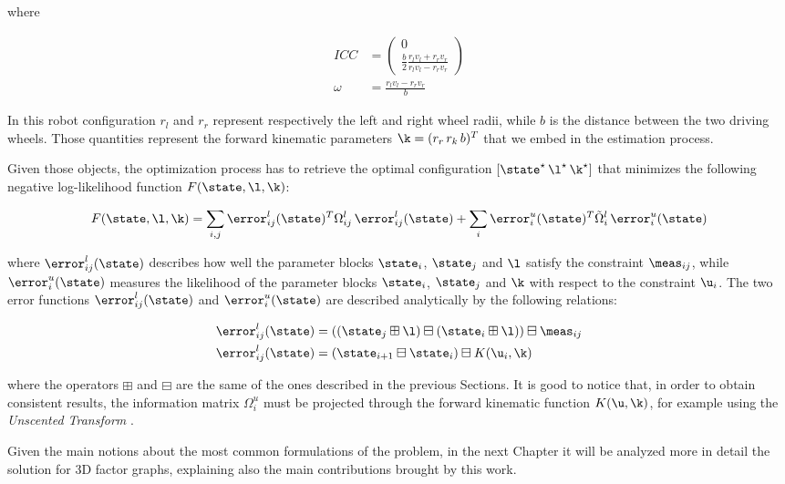 \noindent where 

\begin{align*}
    ICC &= 
        \begin{pmatrix}
            0 \\ \frac{b}{2} \frac{r_l v_l + r_r v_r}{r_l v_l - r_r v_r}
        \end{pmatrix} \\
    \omega &= \frac{r_l v_l - r_r v_r}{b}
\end{align*}

\noindent In this robot configuration $r_l$ and $r_r$ represent respectively the left and right wheel radii, while $b$ is the distance between the two driving wheels. Those quantities represent the forward kinematic parameters $\k = (r_r\,r_k\,b)^T$ that we embed in the estimation process.

Given those objects, the optimization process has to retrieve the optimal configuration $\left[\state^\star \, \l^\star \, \k^\star\right]$ that minimizes the following negative log-likelihood function $F(\state, \l, \k)$:

\begin{equation}
    F(\state, \l, \k) = 
        \sum_{i,j} \error_{ij}^l(\state)^T\Omega_{ij}^l\,\error_{ij}^l(\state) + 
        \sum_{i} \error_{i}^u(\state)^T\tilde{\Omega}_{i}^l\,\error_{i}^u(\state)
\end{equation}

\noindent where $\error_{ij}^l(\state)$ describes how well the parameter blocks $\state_i$, $\state_j$ and $\l$ satisfy the constraint $\meas_{ij}$, while $\error_{i}^u(\state)$ measures the likelihood of the parameter blocks $\state_i$, $\state_j$ and $\k$ with respect to the constraint $\u_i$. The two error functions $\error_{ij}^l(\state)$ and $\error_{i}^u(\state)$ are described analytically by the following relations:

\begin{align*}
    \error_{ij}^l(\state) &= \left(\left(\state_j \boxplus \l\right) \boxminus \left(\state_i \boxplus \l\right)\right) \boxminus \meas_{ij} \\
    \error_{ij}^l(\state) &= \left(\state_{i+1} \boxminus \state_i\right) \boxminus K(\u_i, \k)
\end{align*}

\noindent where the operators $\boxplus$ and $\boxminus$ are the same of the ones described in the previous Sections. It is good to notice that, in order to obtain consistent results, the information matrix $\Omega_{i}^u$ must be projected through the forward kinematic function $K(\u, \k)$, for example using the \textit{Unscented Transform} \cite{julier2002scaledUT}.

\vspace{15px}

Given the main notions about the most common formulations of the problem, in the next Chapter it will be analyzed more in detail the solution for 3D factor graphs, explaining also the main contributions brought by this work.